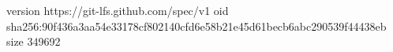 version https://git-lfs.github.com/spec/v1
oid sha256:90f436a3aa54e33178cf802140cfd6e58b21e45d61becb6abc290539f44438eb
size 349692
